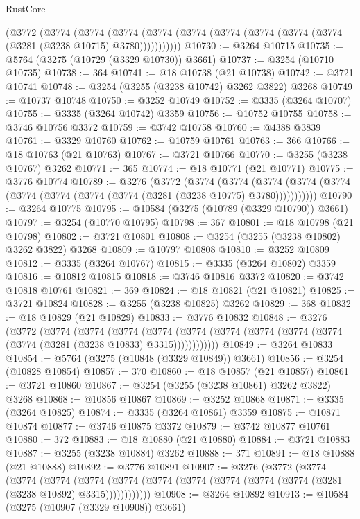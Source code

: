 \begin{lexlean}{RustCore}
\begin{coremodule}
    (@3772
      (@3774
        (@3774
          (@3774 (@3774 (@3774 (@3774 (@3774 (@3774 (@3774 (@3281 (@3238 @10715) @3780)))))))))))
@10730 := @3264 @10715
@10735 := @5764 (@3275 (@10729 (@3329 @10730)) @3661)
@10737 := @3254 (@10710 @10735)
@10738 := 364
@10741 := @18 @10738 (@21 @10738)
@10742 := @3721 @10741
@10748 := @3254 (@3255 (@3238 @10742) @3262 @3822) @3268
@10749 := @10737 @10748
@10750 := @3252 @10749
@10752 := @3335 (@3264 @10707)
@10755 := @3335 (@3264 @10742) @3359
@10756 := @10752 @10755
@10758 := @3746 @10756 @3372
@10759 := @3742 @10758
@10760 := @4388 @3839
@10761 := @3329 @10760
@10762 := @10759 @10761
@10763 := 366
@10766 := @18 @10763 (@21 @10763)
@10767 := @3721 @10766
@10770 := @3255 (@3238 @10767) @3262
@10771 := 365
@10774 := @18 @10771 (@21 @10771)
@10775 := @3776 @10774
@10789 := @3276
    (@3772
      (@3774
        (@3774
          (@3774 (@3774 (@3774 (@3774 (@3774 (@3774 (@3774 (@3281 (@3238 @10775) @3780)))))))))))
@10790 := @3264 @10775
@10795 := @10584 (@3275 (@10789 (@3329 @10790)) @3661)
@10797 := @3254 (@10770 @10795)
@10798 := 367
@10801 := @18 @10798 (@21 @10798)
@10802 := @3721 @10801
@10808 := @3254 (@3255 (@3238 @10802) @3262 @3822) @3268
@10809 := @10797 @10808
@10810 := @3252 @10809
@10812 := @3335 (@3264 @10767)
@10815 := @3335 (@3264 @10802) @3359
@10816 := @10812 @10815
@10818 := @3746 @10816 @3372
@10820 := @3742 @10818 @10761
@10821 := 369
@10824 := @18 @10821 (@21 @10821)
@10825 := @3721 @10824
@10828 := @3255 (@3238 @10825) @3262
@10829 := 368
@10832 := @18 @10829 (@21 @10829)
@10833 := @3776 @10832
@10848 := @3276
    (@3772
      (@3774
        (@3774
          (@3774
            (@3774 (@3774 (@3774 (@3774 (@3774 (@3774 (@3774 (@3281 (@3238 @10833) @3315))))))))))))
@10849 := @3264 @10833
@10854 := @5764 (@3275 (@10848 (@3329 @10849)) @3661)
@10856 := @3254 (@10828 @10854)
@10857 := 370
@10860 := @18 @10857 (@21 @10857)
@10861 := @3721 @10860
@10867 := @3254 (@3255 (@3238 @10861) @3262 @3822) @3268
@10868 := @10856 @10867
@10869 := @3252 @10868
@10871 := @3335 (@3264 @10825)
@10874 := @3335 (@3264 @10861) @3359
@10875 := @10871 @10874
@10877 := @3746 @10875 @3372
@10879 := @3742 @10877 @10761
@10880 := 372
@10883 := @18 @10880 (@21 @10880)
@10884 := @3721 @10883
@10887 := @3255 (@3238 @10884) @3262
@10888 := 371
@10891 := @18 @10888 (@21 @10888)
@10892 := @3776 @10891
@10907 := @3276
    (@3772
      (@3774
        (@3774
          (@3774
            (@3774 (@3774 (@3774 (@3774 (@3774 (@3774 (@3774 (@3281 (@3238 @10892) @3315))))))))))))
@10908 := @3264 @10892
@10913 := @10584 (@3275 (@10907 (@3329 @10908)) @3661)

\end{coremodule}
\end{lexlean}
